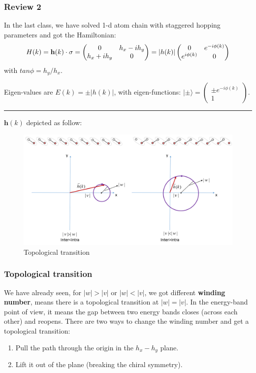 \documentclass[letterpaper,10pt,english]{sphinxmanual}
\begin{document}
\subsubsection{Review 2}
\label{TI/Lecture notes/1:review-2}
In the last class, we have solved 1-d atom chain with staggered hopping
parameters and got the Hamiltonian:
\begin{gather}
\begin{split}H(k)=\mathbf{h}(k)\cdot \mathbf{\sigma}=\begin{pmatrix}0&h_x-ih_y\\h_x+ih_y&0\end{pmatrix}=|h(k)|\begin{pmatrix}0&e^{-i\phi(k)}\\e^{i\phi(k)}&0\end{pmatrix}\end{split}\notag
\end{gather}
with \(tan\phi=h_y/h_x\).

Eigen-values are \(E(k)=\pm|h(k)|\), with eigen-functions:
\(|\pm\rangle=\begin{pmatrix}\pm e^{-i\phi(k)}\\ 1\end{pmatrix}\).


\bigskip\hrule{}\bigskip


\(\mathbf{h}(k)\) depicted as follow:
\begin{figure}[htbp]
\centering
\capstart

\includegraphics[width=0.900\linewidth]{two.png}
\caption{Topological transition}\end{figure}


\subsubsection{Topological transition}
\label{TI/Lecture notes/1:topological-transition}
We have already seen, for \(|w|>|v|\) or \(|w|<|v|\), we got
different \textbf{winding number}, means there is a topological transition at
\(|w|=|v|\). In the energy-band point of view, it means the gap
between two energy bands closes (across each other) and reopens. There
are two ways to change the winding number and get a topological
transition:
\begin{enumerate}
\item {} 
Pull the path through the origin in the \(h_x-h_y\) plane.

\item {} 
Lift it out of the plane (breaking the chiral symmetry).

\end{enumerate}
\end{document}
